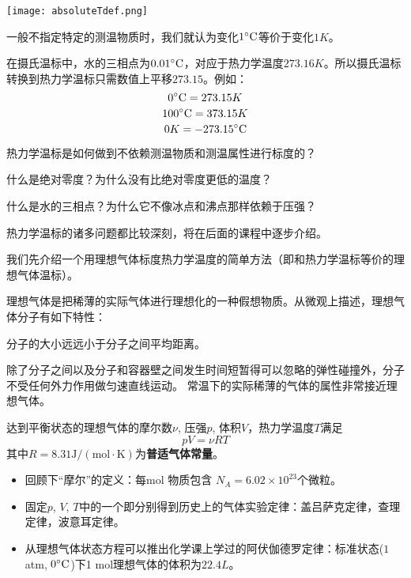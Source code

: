 \documentclass[CJK]{beamer}
\begin{document}
\begin{frame}
\bch
\texttt{[image: absoluteTdef.png]}

一般不指定特定的测温物质时，我们就认为变化$1^\circ \mathrm{C}$等价于变化$1K$。 

在摄氏温标中，水的三相点为$0.01^\circ \mathrm{C}$，对应于热力学温度$273.16K$。所以摄氏温标转换到热力学温标只需数值上平移$273.15$。例如： 
$$0^\circ \mathrm{C} = 273.15 K$$
$$100^\circ \mathrm{C} = 373.15K$$
$$0K = -273.15 ^\circ \mathrm{C}$$
\ech
\end{frame}

\begin{frame}
\bch
\bitem
\item{热力学温标是如何做到不依赖测温物质和测温属性进行标度的？}
\item{什么是绝对零度？为什么没有比绝对零度更低的温度？}
\item{什么是水的三相点？为什么它不像冰点和沸点那样依赖于压强？}
\eitem
\ech
\end{frame}


\begin{frame}
\bch
热力学温标的诸多问题都比较深刻，将在后面的课程中逐步介绍。

\skiplines

我们先介绍一个用理想气体标度热力学温度的简单方法（即和热力学温标等价的理想气体温标）。

\skiplines


理想气体是把稀薄的实际气体进行理想化的一种假想物质。从微观上描述，理想气体分子有如下特性：
\bitem
\item{分子的大小远远小于分子之间平均距离。}
\item{除了分子之间以及分子和容器壁之间发生时间短暂得可以忽略的弹性碰撞外，分子不受任何外力作用做匀速直线运动。}
\eitem
常温下的实际稀薄的气体的属性非常接近理想气体。

\ech
\end{frame}



\begin{frame}
\bch
{\large 达到平衡状态的理想气体的摩尔数$\nu$, 压强$p$, 体积$V$，热力学温度$T$满足
{\color{blue}
$$p V = \nu RT$$
}
其中$R=8.31 \mathrm{J/(mol\cdot K)}$为{\bf 普适气体常量}。
}

{\small
\begin{itemize}
\item{回顾下“摩尔”的定义：每mol 物质包含 $N_A = 6.02\times 10^{23}$个微粒。}
\item{固定$p$, $V$, $T$中的一个即分别得到历史上的气体实验定律：盖吕萨克定律，查理定律，波意耳定律。}
\item{从理想气体状态方程可以推出化学课上学过的阿伏伽德罗定律：标准状态($1$ atm, $0^\circ \mathrm{C}$)下1 mol理想气体的体积为$22.4L$。}
\end{itemize}
}
\ech
\end{frame}
\end{document}
